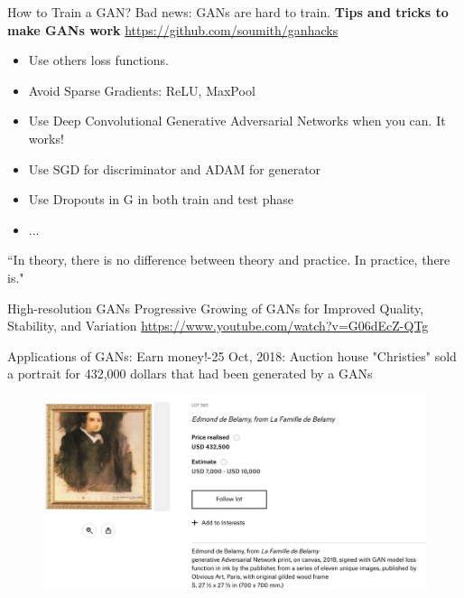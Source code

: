 \documentclass[handout,xcolor=pdftex,dvipsnames,table,mathserif]{beamer}
\begin{document}
\begin{frame}{How to Train a GAN?}
\alert{Bad news: GANs are hard to train}.
\textbf{ Tips and tricks to make GANs work}
\url{https://github.com/soumith/ganhacks}
\begin{itemize}
\item Use others loss functions.
\item Avoid Sparse Gradients: ReLU, MaxPool
\item Use Deep Convolutional Generative Adversarial Networks when you can. It works!
\item Use SGD for discriminator and ADAM for generator
\item Use Dropouts in G in both train and test phase
\item ...
\end{itemize}
\alert{``In theory, there is no difference between theory and practice. In practice, there is."}
\end{frame}

\begin{frame}{High-resolution GANs}
Progressive Growing of GANs for Improved Quality, Stability, and Variation \cite{karras2017progressive}
\url{https://www.youtube.com/watch?v=G06dEcZ-QTg}
\end{frame}

\begin{frame}{Applications of GANs: Earn money!}-25 Oct, 2018:  Auction house "Christies" sold a portrait for 432,000 dollars that had been generated by a GANs
 \begin{figure}
\includegraphics[width=.95\columnwidth]{../graphics/Christie}
\end{figure}
\end{frame}
\end{document}
